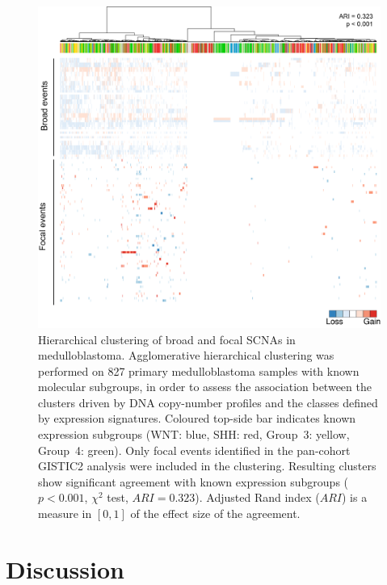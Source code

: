 \begin{figure}[b]
	\begin{center}
		\includegraphics[width=\textwidth]{fig/magic-cn/cn-clusters.png}
	\end{center}
	\caption[Hierarchical clustering of broad and focal SCNAs in medulloblastoma]
	{
		Hierarchical clustering of broad and focal SCNAs in medulloblastoma.
		Agglomerative hierarchical clustering was performed on 827 primary medulloblastoma samples with known molecular subgroups, in order to assess the association between the clusters driven by DNA copy-number profiles and the classes defined by expression signatures. Coloured top-side bar indicates known expression subgroups (WNT: blue, SHH: red, Group~3: yellow, Group~4: green). Only focal events identified in the pan-cohort GISTIC2 analysis were included in the clustering. Resulting clusters show significant agreement with known expression subgroups ($p < 0.001$, $\chi^2$ test, $ARI = 0.323$). Adjusted Rand index ($ARI$) is a measure in $[0, 1]$ of the effect size of the agreement. 
	}
	\label{fig:cn-clusters}
\end{figure}

\clearpage

\section{Discussion}

